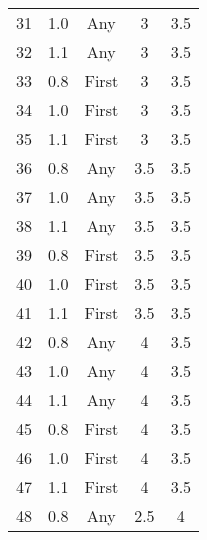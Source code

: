\begin{table}[H]
{\begin{tabular}{ccccc}
      31                &  1.0  & Any     &     3                           & 3.5                    \\ 
      32                &  1.1  & Any     &     3                           & 3.5                     \\ 
      33                &  0.8  & First   &     3                           & 3.5                   \\ 
      34                &  1.0  & First   &     3                           & 3.5                   \\ 
      35                &  1.1  & First   &     3                           & 3.5                   \\ 
      36                &  0.8  & Any     &     3.5                           & 3.5                    \\ 
      37                &  1.0  & Any     &     3.5                           & 3.5                    \\ 
      38                &  1.1  & Any     &     3.5                           & 3.5                     \\ 
      39                &  0.8  & First   &     3.5                           & 3.5                   \\ 
      40                &  1.0  & First   &     3.5                           & 3.5                   \\ 
      41                &  1.1  & First   &     3.5                           & 3.5                   \\ 
      42                &  0.8  & Any     &     4                           & 3.5                    \\ 
      43                &  1.0  & Any     &     4                           & 3.5                    \\ 
      44                &  1.1  & Any     &     4                           & 3.5                     \\ 
      45                &  0.8  & First   &     4                           & 3.5                   \\ 
      46                &  1.0  & First   &     4                           & 3.5                   \\ 
      47                &  1.1  & First   &     4                           & 3.5                   \\ 
      48                &  0.8  & Any     &     2.5                           & 4                    \\ 

\end{tabular}}
\end{table}
